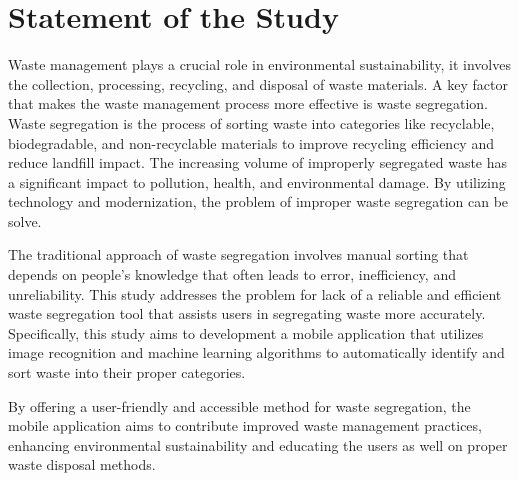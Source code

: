 \section{Statement of the Study}

Waste management plays a crucial role in environmental sustainability, it involves the collection, processing, recycling, and disposal of waste materials. A key factor that makes the waste management process more effective is waste segregation. Waste segregation is the process of sorting waste into categories like recyclable, biodegradable, and non-recyclable materials to improve recycling efficiency and reduce landfill impact. The increasing volume of improperly segregated waste has a significant impact to pollution, health, and environmental damage. By utilizing technology and modernization, the problem of improper waste segregation can be solve.

The traditional approach of waste segregation involves manual sorting that depends on people’s knowledge that often leads to error, inefficiency, and unreliability. This study addresses the problem for lack of a reliable and efficient waste segregation tool that assists users in segregating waste more accurately. Specifically, this study aims to development a mobile application that utilizes image recognition and machine learning algorithms to automatically identify and sort waste into their proper categories.

By offering a user-friendly and accessible method for waste segregation, the mobile application aims to contribute improved waste management practices, enhancing environmental sustainability and educating the users as well on proper waste disposal methods.